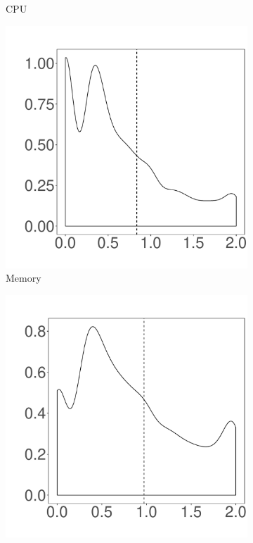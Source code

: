 \documentclass[10pt,journal,compsoc]{IEEEtran}
\begin{document}
\begin{figure}
\begin{subfigure}{0.19\textwidth}
                \caption{CPU}
        \end{subfigure}%
        \begin{subfigure}{0.19\textwidth}
                \includegraphics[width=\linewidth]{Figures/mem-cassandra-cluster.pdf}
                \caption{Memory}
        \end{subfigure}%
        \begin{subfigure}{0.19\textwidth}
                \includegraphics[width=\linewidth]{Figures/ioread-cassandra-cluster.pdf}

\end{subfigure}
\end{figure}
\end{document}
